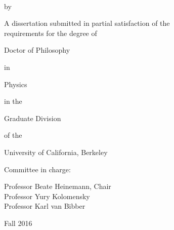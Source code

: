 
\begin{titlepage}

\begin{center}
\large

\hfill
\vfill

\begingroup
\color{title}\Large\spacedallcaps{\myTitle} \\ \bigskip %
\endgroup

by \\ \bigskip

\spacedallcaps{\myName} %

\vfill

A dissertation submitted in partial satisfaction of the \\
requirements for the degree of \\ \bigskip

Doctor of Philosophy \\ \smallskip

in \\ \smallskip

Physics \\ \smallskip

in the \\ \smallskip

Graduate Division \\ \smallskip

of the \\ \smallskip

University of California, Berkeley


\vfill

Committee in charge: \\ \smallskip

Professor Beate Heinemann, Chair \\
Professor Yury Kolomensky \\
Professor Karl van Bibber \\ \bigskip\bigskip

Fall 2016

\end{center}

\end{titlepage}
